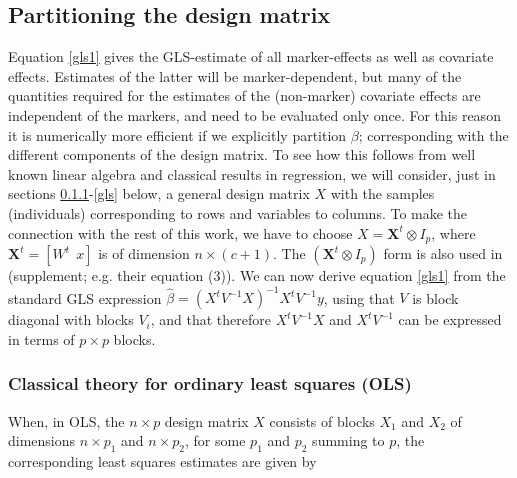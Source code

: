 \documentclass[12pt]{article}
\begin{document}
\subsection{Partitioning the design matrix}
	
Equation \eqref{gls1} gives the GLS-estimate of all marker-effects as well as covariate effects. Estimates of the latter will be marker-dependent, but many of the quantities required for the estimates of the (non-marker) covariate effects are independent of the markers, and need to be evaluated only once. For this reason it is numerically more efficient if we explicitly partition $\beta$; corresponding with the different components of the design matrix. To see how this follows from well known linear algebra and classical results in regression, we will consider, just in sections \ref{ols}-\ref{gls} below, a general design matrix $X$ with the samples (individuals) corresponding to rows and variables to columns. To make the connection with the rest of this work, we have to choose $X = \mathbf{X}^t \otimes I_p$, where $\mathbf{X}^t = [W^t\: \:x]$ is of dimension $n \times (c+1)$. The $(\mathbf{X}^t \otimes I_p)$ form is also used in \cite{zhou_stephens_2014} (supplement; e.g. their equation (3)). We can now derive equation \eqref{gls1} from the   
standard GLS expression $\hat \beta = (X^t V^{-1} X)^{-1} X^t V^{-1} y$, using that $V$ is block diagonal with blocks $V_i$, and that therefore $X^t V^{-1} X$ and $X^t V^{-1}$ can be expressed in terms of $p \times p$ blocks. 



\subsubsection{Classical theory for ordinary least squares (OLS)} \label{ols}
	
When, in OLS, the $n \times p$ design matrix $X$ consists of blocks   
$X_1$ and $X_2$ of dimensions $n \times p_1$ and $n \times p_2$, for some $p_1$ and $p_2$ summing to $p$, the corresponding least squares estimates are given by 
\end{document}
